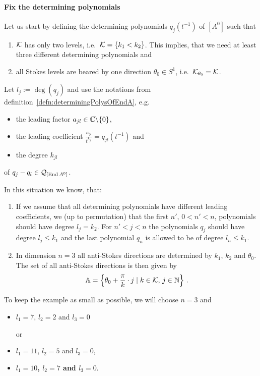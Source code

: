 \paragraph{Fix the determining polynomials}
Let us start by defining the determining polynomials $q_j(t^{-1})$ of $[A^0]$
such that
\begin{enumerate}
  \item $\mathcal{K}$ has only two levels, i.e.\  $\mathcal{K}=\{k_1<k_2\}$.
    This implies, that we need at least three different determining
    polynomials and
  \item all Stokes levels are beared by one direction $\theta_0\in S^1$,
    i.e.\ $\mathcal{K}_{\theta_0}=\mathcal{K}$.
\end{enumerate}
Let $l_j:=\deg(q_j)$ and use the notations from
definition~\ref{defn:determiningPolysOfEndA}, e.g.\
\begin{itemize}
  \item the leading factor $a_{jl}\in\mathbb{C}\backslash\{0\}$,
  \item the leading coefficient $\frac{a_{jl}}{t^{k_{jl}}}=q_{jl}(t^{-1})$ and
  \item the degree $k_{jl}$
\end{itemize}
of $q_j-q_l\in\mathcal{Q}_{[\operatorname{End} A^0]}$.
\begin{rem}
  In this situation we know, that:
  \begin{enumerate}
    \item
      If we assume that all determining polynomials have different leading
      coefficients, we \rewrite{require} (up to permutation) that the first
      $n'$, $0<n'<n$, polynomials should have degree $l_j=k_2$.
      For $n'<j<n$ the polynomials $q_j$ should have degree $l_j\leq k_1$ and
      the last polynomial $q_n$ is allowed to be of degree $l_n\leq k_1$.
    \item In dimension $n=3$
      all anti-Stokes directions are determined by $k_1$, $k_2$ and $\theta_0$.
      The set of all anti-Stokes directions is then given by
      \[
        \mathbb{A}=\left\{
            \theta_0+\frac{\pi}{k}\cdot j\mid k\in\mathcal{K}\text{, } j\in\mathbb{N}
          \right\}\,.
      \]
  \end{enumerate}
\end{rem}
To keep the example as small as possible, we will choose $n=3$ and
\begin{itemize}
  \item $l_1=7$, $l_2=2$ and $l_3=0$
    \begin{comment}
      In the $\cK=\{2,7\}$ case is
      \[
        \cU^{k_2}=\cU^{\leq k_2}=\cU^{\leq k_1}
      \]
    \end{comment}
    or
  \item $l_1=11$, $l_2=5$ and $l_3=0$,
  \item \textbf{\boldmath$l_1=10$, $l_2=7$ and $l_3=0$}.
\end{itemize}
